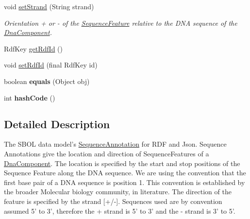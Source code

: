 \begin{DoxyCompactItemize}
void \hyperlink{classorg_1_1sbolstandard_1_1lib_s_b_o_lj_1_1_sequence_annotation_a2cbe0151ae2b5e55ce84f743d69fbb04}{setStrand} (String strand)
\begin{DoxyCompactList}\small\item\em Orientation + or -\/ of the \hyperlink{classorg_1_1sbolstandard_1_1lib_s_b_o_lj_1_1_sequence_feature}{SequenceFeature} relative to the DNA sequence of the \hyperlink{classorg_1_1sbolstandard_1_1lib_s_b_o_lj_1_1_dna_component}{DnaComponent}. \item\end{DoxyCompactList}\item 
RdfKey \hyperlink{classorg_1_1sbolstandard_1_1lib_s_b_o_lj_1_1_sequence_annotation_a1f19b514d0479cc3a72c28ee30fa039d}{getRdfId} ()
\item 
void \hyperlink{classorg_1_1sbolstandard_1_1lib_s_b_o_lj_1_1_sequence_annotation_a2d6d50edfb41d4f6f5553437681b755a}{setRdfId} (final RdfKey id)
\item 
\hypertarget{classorg_1_1sbolstandard_1_1lib_s_b_o_lj_1_1_sequence_annotation_a957f1186f47b0929d759900e6edfbc1c}{
boolean {\bfseries equals} (Object obj)}
\label{classorg_1_1sbolstandard_1_1lib_s_b_o_lj_1_1_sequence_annotation_a957f1186f47b0929d759900e6edfbc1c}

\item 
\hypertarget{classorg_1_1sbolstandard_1_1lib_s_b_o_lj_1_1_sequence_annotation_afd50d2e97e53ba975a7a1637aeab66d2}{
int {\bfseries hashCode} ()}
\label{classorg_1_1sbolstandard_1_1lib_s_b_o_lj_1_1_sequence_annotation_afd50d2e97e53ba975a7a1637aeab66d2}

\end{DoxyCompactItemize}


\subsection{Detailed Description}
The SBOL data model's \hyperlink{classorg_1_1sbolstandard_1_1lib_s_b_o_lj_1_1_sequence_annotation}{SequenceAnnotation} for RDF and Json. Sequence Annotations give the location and direction of SequenceFeatures of a \hyperlink{classorg_1_1sbolstandard_1_1lib_s_b_o_lj_1_1_dna_component}{DnaComponent}. The location is specified by the start and stop positions of the Sequence Feature along the DNA sequence. We are using the convention that the first base pair of a DNA sequence is position 1. This convention is established by the broader Molecular biology community, in literature. The direction of the feature is specified by the strand \mbox{[}+/-\/\mbox{]}. Sequences used are by convention assumed 5' to 3', therefore the {\ttfamily +} strand is 5' to 3' and the {\ttfamily -\/} strand is 3' to 5'.

